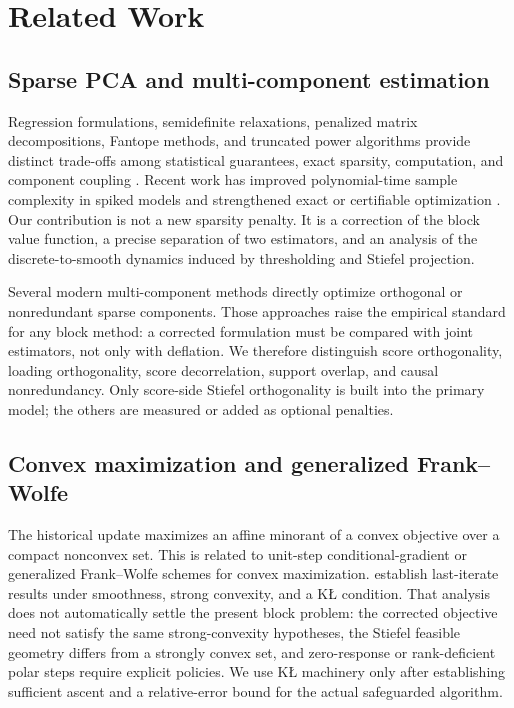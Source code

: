 \section{Related Work}
\label{sec:related}
\subsection{Sparse PCA and multi-component estimation}
Regression formulations, semidefinite relaxations, penalized matrix decompositions, Fantope methods, and truncated power algorithms provide distinct trade-offs among statistical guarantees, exact sparsity, computation, and component coupling \citep{zou2006sparse,daspremont2007direct,daspremont2008optimal,witten2009penalized,vu2013fantope,yuan2013truncated}. Recent work has improved polynomial-time sample complexity in spiked models and strengthened exact or certifiable optimization \citep{cai2025fast,bertsimas2022certifiable}. Our contribution is not a new sparsity penalty. It is a correction of the block value function, a precise separation of two estimators, and an analysis of the discrete-to-smooth dynamics induced by thresholding and Stiefel projection.

Several modern multi-component methods directly optimize orthogonal or nonredundant sparse components. Those approaches raise the empirical standard for any block method: a corrected formulation must be compared with joint estimators, not only with deflation. We therefore distinguish score orthogonality, loading orthogonality, score decorrelation, support overlap, and causal nonredundancy. Only score-side Stiefel orthogonality is built into the primary model; the others are measured or added as optional penalties.

\subsection{Convex maximization and generalized Frank--Wolfe}
The historical update maximizes an affine minorant of a convex objective over a compact nonconvex set. This is related to unit-step conditional-gradient or generalized Frank--Wolfe schemes for convex maximization. \citet{aktas2025strongly} establish last-iterate results under smoothness, strong convexity, and a KŁ condition. That analysis does not automatically settle the present block problem: the corrected objective need not satisfy the same strong-convexity hypotheses, the Stiefel feasible geometry differs from a strongly convex set, and zero-response or rank-deficient polar steps require explicit policies. We use KŁ machinery only after establishing sufficient ascent and a relative-error bound for the actual safeguarded algorithm.

